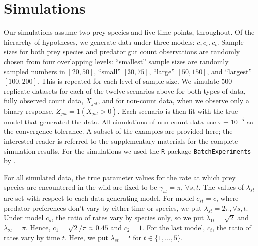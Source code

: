 \section{Simulations}
\label{sec:sim}

Our simulations assume two prey species and five time points, throughout.  Of the hierarchy of hypotheses, we generate data under three models: $c, c_s, c_t$.  Sample sizes for both prey species and predator gut count observations are randomly chosen from four overlapping levels: ``smallest'' sample sizes are randomly sampled numbers in $[20,50]$, ``small'' $[30,75]$, ``large'' $[50,150]$, and ``largest'' $[100,200]$.  This is repeated for each level of sample size.  We simulate $500$ replicate datasets for each of the twelve scenarios above for both types of data, fully observed count data, $X_{jst}$, and for non-count data, when we observe only a binary response, $Z_{jst} = 1(X_{jst}>0)$.  Each scenario is then fit with the true model that generated the data.  All simulations of non-count data use $\tau = 10^{-5}$ as the convergence tolerance.  A subset of the examples are provided here; the interested reader is referred to the supplementary materials for the complete simulation results.  For the simulations we used the \texttt{R} \cite{Core-Team:2014} package \texttt{BatchExperiments} by \cite{Bischl:2014}.

For all simulated data, the true parameter values for the rate at which prey species are encountered in the wild are fixed to be $\gamma_{st} = \pi, \, \forall s,t$. The values of $\lambda_{st}$ are set with respect to each data generating model.  For model $c_{st} = c$, where predator preferences don't vary by either time or species, we put $\lambda_{st} = 2\pi, \forall s,t$.  Under model $c_s$, the ratio of rates vary by species only, so we put $\lambda_{1t} = \sqrt{2}$ and $\lambda_{2t} = \pi$.  Hence, $c_1 = \sqrt{2}/\pi \approx 0.45$ and $c_2 = 1$.  For the last model, $c_t$, the ratio of rates vary by time $t$.  Here, we put $\lambda_{st} = t$ for $t \in \{1, \ldots, 5 \}$.  

